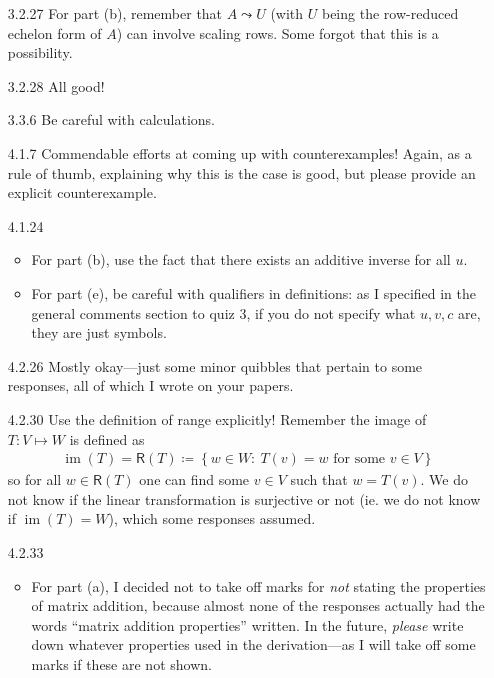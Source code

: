 \documentclass{amsart}
\theoremstyle{definition}
\theoremstyle{definition}
\DeclareMathOperator{\im}{im}
\DeclareMathOperator{\1}{\mathbbm{1}}
\newcommand{\rng}{\mathsf{R}}
\newcommand{\condset}[4]{\left\{ #1  : \: #2 #3 #4 \right\}}
\begin{document}
\begin{enumerate}[itemsep = 2mm]
	\item[3.2.27] For part (b), remember that $A \leadsto U$ (with $U$ being the row-reduced echelon form of $A$) can involve scaling rows. Some forgot that this is a possibility.
	
	
	\item[3.2.28] All good!
	
	
	
	\item[3.3.6] Be careful with calculations.
	
	
	
	\item[4.1.7] Commendable efforts at coming up with counterexamples! Again, as a rule of thumb, explaining why this is the case is good, but please provide an explicit counterexample.
	
	
	
	\item[4.1.24] \begin{itemize}
		\item For part (b), use the fact that there exists an additive inverse for all $u$.
		
		\item For part (e), be careful with qualifiers in definitions: as I specified in the general comments section to quiz 3, if you do not specify what $u,v,c$ are, they are just symbols.
	\end{itemize}
	
	
	
	\item[4.2.26] Mostly okay---just some minor quibbles that pertain to some responses, all of which I wrote on your papers.
	
	
	
	
	\item[4.2.30] Use the definition of range explicitly! Remember the image of $T: V \mapsto W$ is defined as
	\begin{align*}
	\im (T) = \rng(T) \coloneqq \condset{w \in W}{T(v)}{=}{w \text{ for some } v \in V}
	\end{align*}
	so for all $w \in \rng(T)$ one can find some $v \in V$ such that $w = T(v)$. We do not know if the linear transformation is surjective or not (ie. we do not know if $\im(T) = W$), which some responses assumed.
	
	
	\item[4.2.33] \begin{itemize}
		\item For part (a), I decided not to take off marks for \textit{not} stating the properties of matrix addition, because almost none of the responses actually had the words ``matrix addition properties'' written. In the future, \textit{please} write down whatever properties used in the derivation---as I will take off some marks if these are not shown.
		

\end{itemize}
\end{enumerate}
\end{document}
